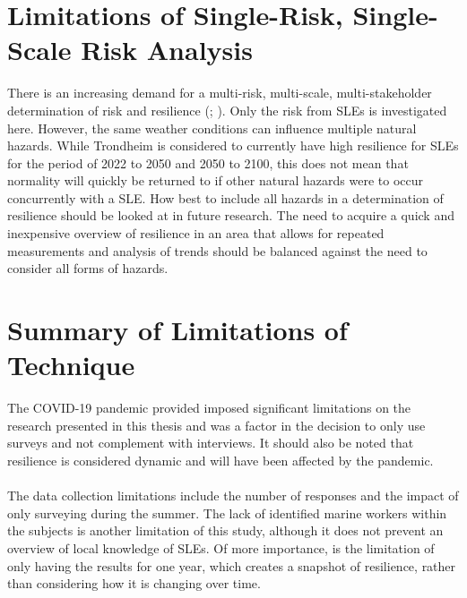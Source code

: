 \section{Limitations of Single-Risk, Single-Scale Risk Analysis} \label{discussion-limitation-single-risk}
There is an increasing demand for a multi-risk, multi-scale, multi-stakeholder determination of risk and resilience (\cite{gerkensmeier_governing_2018}; \cite{cutter_community_2020}).  Only the risk from SLEs is investigated here. However, the same weather conditions can influence multiple natural hazards. While Trondheim is considered to currently have high resilience for SLEs for the period of 2022 to 2050 and 2050 to 2100, this does not mean that normality will quickly be returned to if  other natural hazards were to occur concurrently with a SLE. How best to include all hazards in a determination of resilience should be looked at in future research. The need to acquire a quick and inexpensive overview of resilience in an area that allows for repeated measurements and analysis of trends should be balanced against the need to consider all forms of hazards. 
\paragraph{}


\section{Summary of Limitations of Technique}
The COVID-19 pandemic provided imposed significant limitations on the research presented in this thesis and was a factor in the decision to only use surveys and not complement with interviews. It should also be noted that resilience is considered dynamic and will have been affected by the pandemic. 
\paragraph{}
The data collection limitations include the number of responses and the impact of only surveying during the summer. The lack of identified marine workers within the subjects is another limitation of this study, although it does not prevent an overview of local knowledge of SLEs. Of more importance, is the limitation of only having the results for one year, which creates a snapshot of resilience, rather than considering how it is changing over time. 


